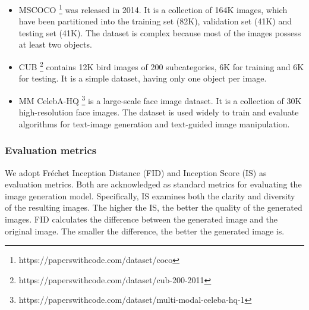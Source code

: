 \documentclass{article}
\begin{document}
\begin{itemize}
    \item MSCOCO \footnote{https://paperswithcode.com/dataset/coco} was released in 2014. It is a collection of 164K images, which have been partitioned into the training set (82K), validation set (41K) and testing set (41K). The dataset is complex because most of the images possess at least two objects.
    \item CUB \footnote{https://paperswithcode.com/dataset/cub-200-2011} contains 12K bird images of 200 subcategories, 6K for training and 6K for testing. It is a simple dataset, having only one object per image.
    \item MM CelebA-HQ \footnote{https://paperswithcode.com/dataset/multi-modal-celeba-hq-1} is a large-scale face image dataset. It is a collection of 30K high-resolution face images. The dataset is used widely to train and evaluate algorithms for text-image generation and text-guided image manipulation. 
\end{itemize}

\subsubsection{Evaluation metrics}
We adopt Fréchet Inception Distance (FID) \cite{Heusel2017GANsTB} and Inception Score (IS) \cite{Li2019ObjectDrivenTS} as evaluation metrics. Both are acknowledged as standard metrics for evaluating the image generation model. Specifically, IS examines both the clarity and diversity of the resulting images. The higher the IS, the better the quality of the generated images. FID calculates the difference between the generated image and the original image. The smaller the difference, the better the generated image is.
\end{document}

